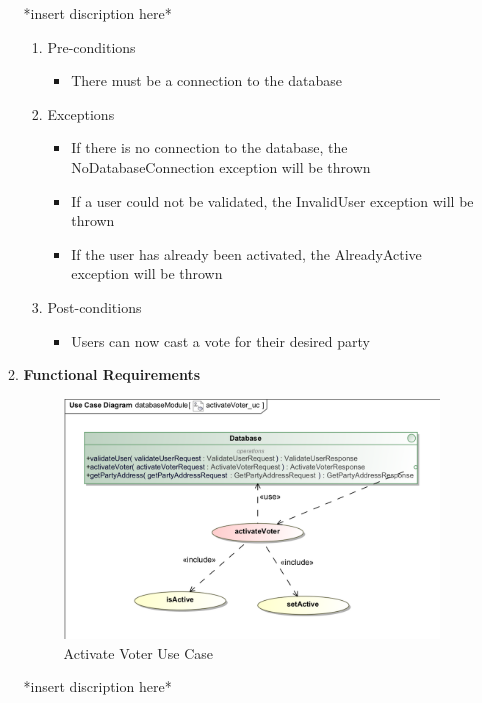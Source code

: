 \begin{enumerate}
\begin{enumerate}
			*insert discription here*
			\newline
			
			\begin{enumerate}
				\item Pre-conditions
				\begin{itemize}
					\item There must be a connection to the database
				\end{itemize}
				
				\item Exceptions
				\begin{itemize}
						\item If there is no connection to the database, the NoDatabaseConnection exception will be thrown
						\item If a user could not be validated, the InvalidUser exception will be thrown
						\item If the user has already been activated, the AlreadyActive exception will be thrown
				\end{itemize}
				
				\item Post-conditions
				\begin{itemize}
					\item Users can now cast a vote for their desired party
				\end{itemize}
			\end{enumerate}
			
			\item \textbf{Functional Requirements}
			\begin{figure}[H]
				\centering
				\includegraphics[width=0.75\linewidth]{../Images/Database/UseCases/ActivateVoter_UseCase.png}
				\caption{Activate Voter Use Case}
			\end{figure}
			
			*insert discription here*
			\newline
			

\end{enumerate}
\end{enumerate}
